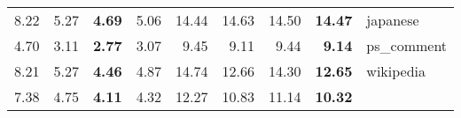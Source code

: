 {\begin{tabular}{|rrrr|rrrr|l|}
{\scriptsize{ 8.22}}& {\scriptsize{ 5.27}}& {\scriptsize{\bf  4.69}}& {\scriptsize{ 5.06}}& {\scriptsize{14.44}}& {\scriptsize{14.63}}& {\scriptsize{14.50}}& {\scriptsize{\bf 14.47}}& {\scriptsize japanese}\\
{\scriptsize{ 4.70}}& {\scriptsize{ 3.11}}& {\scriptsize{\bf  2.77}}& {\scriptsize{ 3.07}}& {\scriptsize{ 9.45}}& {\scriptsize{ 9.11}}& {\scriptsize{ 9.44}}& {\scriptsize{\bf  9.14}}& {\scriptsize ps\_comment}\\
{\scriptsize{ 8.21}}& {\scriptsize{ 5.27}}& {\scriptsize{\bf  4.46}}& {\scriptsize{ 4.87}}& {\scriptsize{14.74}}& {\scriptsize{12.66}}& {\scriptsize{14.30}}& {\scriptsize{\bf 12.65}}& {\scriptsize wikipedia}\\
\hline
{\scriptsize{ 7.38}}& {\scriptsize{ 4.75}}& {\scriptsize{\bf  4.11}}& {\scriptsize{ 4.32}}& {\scriptsize{12.27}}& {\scriptsize{10.83}}& {\scriptsize{11.14}}& {\scriptsize{\bf 10.32}}& \\
\hline
\end{tabular}}
